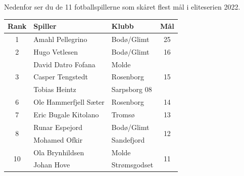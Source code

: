 \newpage
{}
Nedenfor ser du de 11 fotballspillerne som skåret flest mål i eliteserien 2022.
\begin{center}
	\small
	\begin{tabular}{|c|l|l|c|}
		\hline
		\textbf{Rank} & \textbf{Spiller} & \textbf{Klubb} & \textbf{Mål} \\
		\hline
		1 & Amahl Pellegrino & Bodø/Glimt & 25 \\
		\hline
		2 & Hugo Vetlesen & Bodø/Glimt & 16 \\
		\hline
		\multirow{3}{*}{3} & David Datro Fofana & Molde & \multirow{3}{*}{15} \\
		\cline{2-3}
		& Casper Tengstedt & Rosenborg & \\
		\cline{2-3}
		& Tobias Heintz & Sarpsborg 08 & \\
		\hline
		6 & Ole Hammerfjell Sæter & Rosenborg & 14 \\
		\hline
		7 & Eric Bugale Kitolano & Tromsø & 13 \\
		\hline
		\multirow{2}{*}{8} & Runar Espejord & Bodø/Glimt & \multirow{2}{*}{12} \\
		\cline{2-3}
		& Mohamed Ofkir & Sandefjord & \\
		\hline
		\multirow{2}{*}{10} & Ola Brynhildsen & Molde & \multirow{2}{*}{11} \\
		\cline{2-3}
		& Johan Hove & Strømsgodset & \\
		\hline
	\end{tabular}
\end{center}

